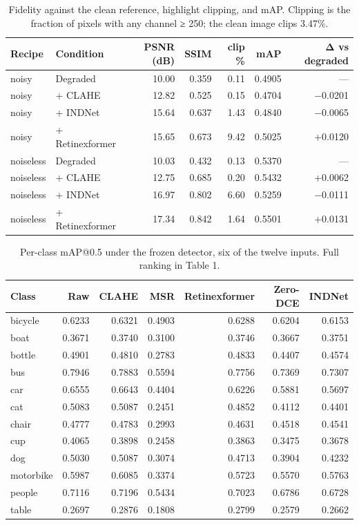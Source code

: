 \begin{table}[t]
\centering
\small
\caption{Fidelity against the clean reference, highlight clipping, and mAP. Clipping is the fraction of pixels with any channel ≥ 250; the clean image clips 3.47\%.}
\label{tab:table7}
\begin{tabular}{llrrrrr}
\toprule
Recipe & Condition & PSNR (dB) & SSIM & clip \% & mAP & Δ vs degraded \\
\midrule
noisy & Degraded & 10.00 & 0.359 & 0.11 & 0.4905 & — \\
noisy & + CLAHE & 12.82 & 0.525 & 0.15 & 0.4704 & $-$0.0201 \\
noisy & + INDNet & 15.64 & 0.637 & 1.43 & 0.4840 & $-$0.0065 \\
noisy & + Retinexformer & 15.65 & 0.673 & 9.42 & 0.5025 & +0.0120 \\
noiseless & Degraded & 10.03 & 0.432 & 0.13 & 0.5370 & — \\
noiseless & + CLAHE & 12.75 & 0.685 & 0.20 & 0.5432 & +0.0062 \\
noiseless & + INDNet & 16.97 & 0.802 & 6.60 & 0.5259 & $-$0.0111 \\
noiseless & + Retinexformer & 17.34 & 0.842 & 1.64 & 0.5501 & +0.0131 \\
\bottomrule
\end{tabular}
\end{table}

\begin{table}[t]
\centering
\small
\caption{Per-class mAP@0.5 under the frozen detector, six of the twelve inputs. Full ranking in Table 1.}
\label{tab:tablea1}
\begin{tabular}{lrrrrrr}
\toprule
Class & Raw & CLAHE & MSR & Retinexformer & Zero-DCE & INDNet \\
\midrule
bicycle & 0.6233 & 0.6321 & 0.4903 & 0.6288 & 0.6204 & 0.6153 \\
boat & 0.3671 & 0.3740 & 0.3100 & 0.3746 & 0.3667 & 0.3751 \\
bottle & 0.4901 & 0.4810 & 0.2783 & 0.4833 & 0.4407 & 0.4574 \\
bus & 0.7946 & 0.7883 & 0.5594 & 0.7756 & 0.7369 & 0.7307 \\
car & 0.6555 & 0.6643 & 0.4404 & 0.6226 & 0.5881 & 0.5697 \\
cat & 0.5083 & 0.5087 & 0.2451 & 0.4852 & 0.4112 & 0.4401 \\
chair & 0.4777 & 0.4783 & 0.2993 & 0.4631 & 0.4518 & 0.4541 \\
cup & 0.4065 & 0.3898 & 0.2458 & 0.3863 & 0.3475 & 0.3678 \\
dog & 0.5030 & 0.5087 & 0.3074 & 0.4713 & 0.3904 & 0.4232 \\
motorbike & 0.5987 & 0.6085 & 0.3374 & 0.5723 & 0.5570 & 0.5763 \\
people & 0.7116 & 0.7196 & 0.5434 & 0.7023 & 0.6786 & 0.6728 \\
table & 0.2697 & 0.2876 & 0.1808 & 0.2799 & 0.2579 & 0.2662 \\
\bottomrule
\end{tabular}
\end{table}

